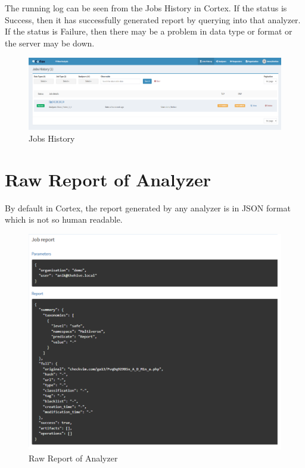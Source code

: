 \documentclass{book}
\begin{document}
The running log can be seen from the Jobs History in Cortex. If the status
is Success, then it has successfully generated report by querying into that
analyzer. If the status is Failure, then there may be a problem in data type
or format or the server may be down.

\begin{figure}[htbp]
    \centering
    \includegraphics[width=1\linewidth]{cortex_images/12.png}
    \caption{Jobs History}
    \label{fig:enter-label}
\end{figure}

\newpage

\section{Raw Report of Analyzer}
By default in Cortex, the report generated by any analyzer is in JSON format
which is not so human readable.

\begin{figure}[htbp]
    \centering
    \includegraphics[width=1\linewidth]{cortex_images/13.png}
    \caption{Raw Report of Analyzer}
    \label{fig:enter-label}
\end{figure}
\end{document}
